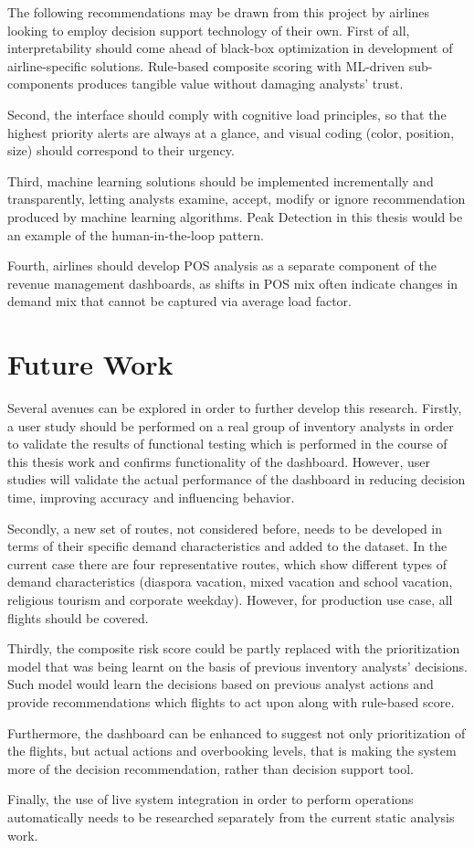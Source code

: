 The following recommendations may be drawn from this project by airlines looking to employ decision support technology of their own. First of all, interpretability should come ahead of black-box optimization in development of airline-specific solutions. Rule-based composite scoring with ML-driven sub-components produces tangible value without damaging analysts' trust.

Second, the interface should comply with cognitive load principles, so that the highest priority alerts are always at a glance, and visual coding (color, position, size) should correspond to their urgency.

Third, machine learning solutions should be implemented incrementally and transparently, letting analysts examine, accept, modify or ignore recommendation produced by machine learning algorithms. Peak Detection in this thesis would be an example of the human-in-the-loop pattern.

Fourth, airlines should develop POS analysis as a separate component of the revenue management dashboards, as shifts in POS mix often indicate changes in demand mix that cannot be captured via average load factor.

\section{Future Work}

Several avenues can be explored in order to further develop this research. Firstly, a user study should be performed on a real group of inventory analysts in order to validate the results of functional testing which is performed in the course of this thesis work and confirms functionality of the dashboard. However, user studies will validate the actual performance of the dashboard in reducing decision time, improving accuracy and influencing behavior.

Secondly, a new set of routes, not considered before, needs to be developed in terms of their specific demand characteristics and added to the dataset. In the current case there are four representative routes, which show different types of demand characteristics (diaspora vacation, mixed vacation and school vacation, religious tourism and corporate weekday). However, for production use case, all flights should be covered.

Thirdly, the composite risk score could be partly replaced with the prioritization model that was being learnt on the basis of previous inventory analysts' decisions. Such model would learn the decisions based on previous analyst actions and provide recommendations which flights to act upon along with rule-based score.

Furthermore, the dashboard can be enhanced to suggest not only prioritization of the flights, but actual actions and overbooking levels, that is making the system more of the decision recommendation, rather than decision support tool.

Finally, the use of live system integration in order to perform operations automatically needs to be researched separately from the current static analysis work.